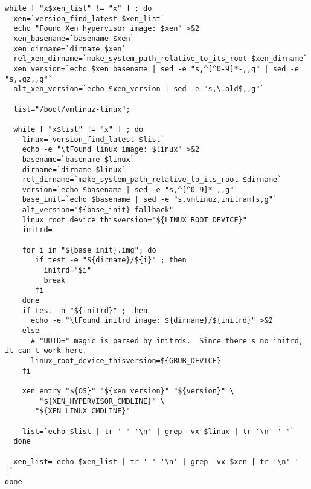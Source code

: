 \begin{lstlisting}
while [ "x$xen_list" != "x" ] ; do
  xen=`version_find_latest $xen_list`
  echo "Found Xen hypervisor image: $xen" >&2
  xen_basename=`basename $xen`
  xen_dirname=`dirname $xen`
  rel_xen_dirname=`make_system_path_relative_to_its_root $xen_dirname`
  xen_version=`echo $xen_basename | sed -e "s,^[^0-9]*-,,g" | sed -e "s,.gz,,g"`
  alt_xen_version=`echo $xen_version | sed -e "s,\.old$,,g"`

  list="/boot/vmlinuz-linux";

  while [ "x$list" != "x" ] ; do
    linux=`version_find_latest $list`
    echo -e "\tFound linux image: $linux" >&2
    basename=`basename $linux`
    dirname=`dirname $linux`
    rel_dirname=`make_system_path_relative_to_its_root $dirname`
    version=`echo $basename | sed -e "s,^[^0-9]*-,,g"`
    base_init=`echo $basename | sed -e "s,vmlinuz,initramfs,g"`
    alt_version="${base_init}-fallback"
    linux_root_device_thisversion="${LINUX_ROOT_DEVICE}"
    initrd=

    for i in "${base_init}.img"; do
       if test -e "${dirname}/${i}" ; then
         initrd="$i"
         break
       fi
    done
    if test -n "${initrd}" ; then
      echo -e "\tFound initrd image: ${dirname}/${initrd}" >&2
    else
      # "UUID=" magic is parsed by initrds.  Since there's no initrd, it can't work here.
      linux_root_device_thisversion=${GRUB_DEVICE}
    fi

    xen_entry "${OS}" "${xen_version}" "${version}" \
        "${XEN_HYPERVISOR_CMDLINE}" \
       "${XEN_LINUX_CMDLINE}"

    list=`echo $list | tr ' ' '\n' | grep -vx $linux | tr '\n' ' '`
  done

  xen_list=`echo $xen_list | tr ' ' '\n' | grep -vx $xen | tr '\n' ' '`
done
\end{lstlisting}

